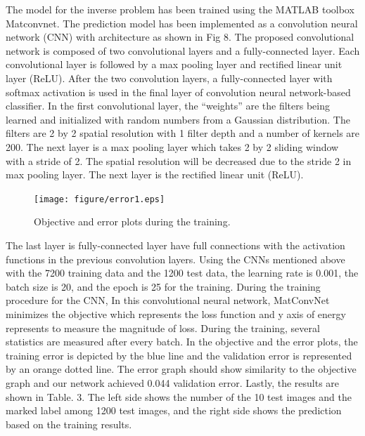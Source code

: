 The model for the inverse problem has been trained using the MATLAB toolbox Matconvnet.
The prediction model has been implemented as a convolution neural network (CNN) with architecture as shown in Fig 8.
The proposed convolutional network is composed of two convolutional layers and a fully-connected layer.
Each convolutional layer is followed by a max pooling layer and rectified linear unit layer (ReLU).
After the two convolution layers, a fully-connected layer with softmax activation is used in the final layer of convolution neural network-based classifier.
In the first convolutional layer, the “weights” are the filters being learned and initialized with random numbers from a Gaussian distribution.
The filters are 2 by 2 spatial resolution with 1 filter depth and a number of kernels are 200.
The next layer is a max pooling layer which takes 2 by 2 sliding window with a stride of 2.
The spatial resolution will be decreased due to the stride 2 in max pooling layer.
The next layer is the rectified linear unit (ReLU).
{}
{}
\label{subsubsec3}
\begin{figure}
\centering
\texttt{[image: figure/error1.eps]}
\caption{Objective and error plots during the training.}
\label{fig:5}       
\end{figure}
The last layer is fully-connected layer have full connections with the activation functions in the previous convolution layers.
{}
Using the CNNs mentioned above with the 7200 training data and the 1200 test data, the learning rate is 0.001, the batch size is 20, and the epoch is 25 for the training. 
During the training procedure for the CNN, {}
In this convolutional neural network, MatConvNet minimizes the objective which represents the loss function and y axis of energy represents to measure the magnitude of loss.
During the training, several statistics are measured after every batch.
In the objective and the error plots, the training error is depicted by the blue line and the validation error is represented by an orange dotted line. The error graph should show similarity to the objective graph and our network achieved 0.044 validation error. Lastly, the results are shown in Table. 3. The left side shows the number of the 10 test images and the marked label among 1200 test images, and the right side shows the prediction based on the training results.

